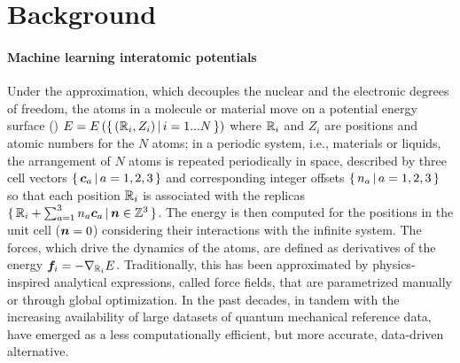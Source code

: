 \documentclass[10pt]{article} %
\begin{document}
\section{Background}
\label{sec:background}

\paragraph{Machine learning interatomic potentials}
\label{sub:mlp}


Under the \cite{bo1927} approximation, which decouples the nuclear and the electronic degrees of freedom, the atoms in a molecule or material move on a potential energy surface (\pes)
$E = E\left(\{\, (\mathbb{R}_i,Z_i)\, |\, i=1...N \, \}\right)$
where $\mathbb{R}_i$ and $Z_i$ are positions and atomic numbers for the $N$ atoms; in a periodic system, i.e., materials or liquids, the arrangement of $N$ atoms is repeated periodically in space, described by three cell vectors $\{\, {\bm{c}}_a\, |\, a=1,2,3 \, \}$ and corresponding integer offsets $\{\, n_a\, |\, a=1,2,3 \, \}$ so that each position $\mathbb{R}_i$ is associated with the replicas $\{\, \mathbb{R}_i + \sum_{a=1}^3 n_a {\bm{c}}_a\, |\, {\bm{n}} \in \mathbb{Z}^3 \, \}$. The energy is then computed for the positions in the unit cell (${\bm{n}} = 0$) considering their interactions with the infinite  system.
The forces, which drive the dynamics of the atoms, are defined as derivatives of the energy ${\bm{f}}_i = - \nabla_{\mathbb{R}_i} E$.
Traditionally, this \pes has been approximated by physics-inspired analytical expressions, called force fields, that are parametrized manually or through global optimization.
In the past decades, in tandem with the increasing availability of large datasets of quantum mechanical reference data, \mlps have emerged as a less computationally efficient, but more accurate, data-driven alternative.
\end{document}
